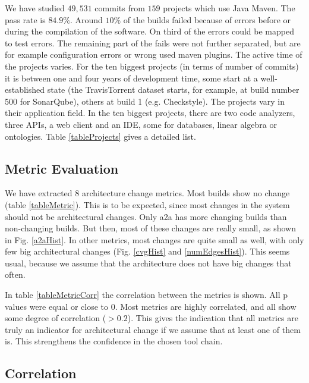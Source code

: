 \documentclass[sigplan, anonymous, review]{acmart}
\begin{document}
We have studied $49,531$ commits from $159$ projects which use Java Maven. The pass rate is $84.9\%$. Around $10\%$ of the builds failed because of errors before or during the compilation of the software. On third of the errors could be mapped to test errors. The remaining part of the fails were not further separated, but are for example configuration errors or wrong used maven plugins.
The active time of the projects varies. For the ten biggest projects (in terms of number of commits) it is between one and four years of development time, some start at a well-established state (the TravisTorrent dataset starts, for example, at build number 500 for SonarQube), others at build 1 (e.g. Checkstyle). The projects vary in their application field. In the ten biggest projects, there are two code analyzers, three APIs, a web client and an IDE, some for databases, linear algebra or ontologies. Table \ref{tableProjects} gives a detailed list.

\subsection{Metric Evaluation}



We have extracted 8 architecture change metrics. Most builds show no change (table \ref{tableMetric}). This is to be expected, since most changes in the system should not be architectural changes. 
Only a2a has more changing builds than non-changing builds. But then, most of these changes are really small, as shown in Fig. \ref{a2aHist}. In other metrics, most changes are quite small as well, with only few big architectural changes (Fig. \ref{cvgHist} and \ref{numEdgesHist}). This seems usual, because we assume that the architecture does not have big changes that often.

In table \ref{tableMetricCorr} the correlation between the metrics is shown. All p values were equal or close to 0. Most metrics are highly correlated, and all show some degree of correlation ($>0.2$). This gives the indication that all metrics are truly an indicator for architectural change if we assume that at least one of them is. This strengthens the confidence in the chosen tool chain. 

\subsection{Correlation}
\end{document}
